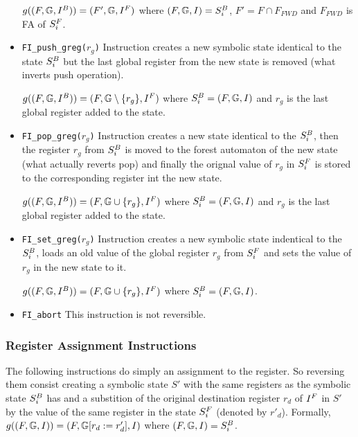 \begin{itemize}
		$g((F, \mathbb{G}, I^{B})) = (F', \mathbb{G}, I^{F})$
			where $(F, \mathbb{G}, I) = S^{B}_{i}$, $F' = F \cap F_{FWD}$ and $F_{FWD}$ is
			FA of $S^{F}_{i}$.

	\item {\tt FI\_push\_greg($r_g$)}
		Instruction creates a new symbolic state identical to the state $S^{B}_{i}$ but
		the last global register from the new state is removed (what inverts push operation).

		$g((F, \mathbb{G}, I^{B})) = (F, \mathbb{G} \setminus \{r_g\}, I^{F})$ where $S^{B}_{i} = (F, \mathbb{G}, I)$ and $r_g$
		is the last global register added to the state.

	\item {\tt FI\_pop\_greg($r_g$)}
		Instruction creates a new state identical to the $S^{B}_{i}$,
		then the register $r_g$ from $S^{B}_{i}$ is moved to the
		forest automaton of the new state (what actually reverts pop)
		and finally the orignal value of $r_g$ in $S^{F}_{i}$ is stored
		to the corresponding register int the new state.
	
		$g((F, \mathbb{G}, I^{B})) = (F, \mathbb{G} \cup \{r_g\}, I^{F})$ where $S^{B}_{i} = (F, \mathbb{G}, I)$ and $r_g$
		is the last global register added to the state.
	
	\item {\tt FI\_set\_greg($r_g$)}
		Instruction creates a new symbolic state indentical to the $S^{B}_{i}$,
		loads an old value of the global register $r_g$ from $S^{F}_{i}$
		and sets the value of $r_g$ in the new state to it.

		$g((F, \mathbb{G}, I^{B})) = (F, \mathbb{G} \cup \{r_g\}, I^{F})$ where $S^{B}_{i} = (F, \mathbb{G}, I)$.

	\item {\tt FI\_abort}
		This instruction is not reversible.

\end{itemize}

\subsubsection{Register Assignment Instructions}
The following instructions do simply an assignment to the register.
So reversing them consist creating a symbolic state $S'$ with
the same registers as the symbolic state $S^{B}_{i}$ has
and a substition of the original destination register $r_d$ of $I^{F}$ in $S'$
by the value of the same register in the state $S^{F}_{i}$ (denoted by $r'_d$).
Formally, $g((F, \mathbb{G}, I)) = (F, \mathbb{G} [r_{d} := r'_{d}]
			, I)$
			where $(F, \mathbb{G}, I) = S^{B}_{i}$.

